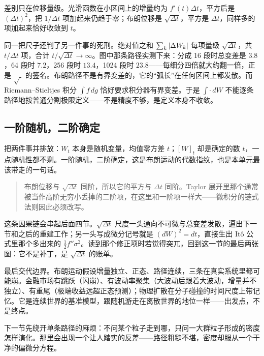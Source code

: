差别只在位移量级。光滑函数在小区间上的增量约为 \(f'(t)\Delta t\)，平方后是 \((\Delta t)^2\)，把 \(1/\Delta t\) 项加起来仍趋于零；布朗位移是 \(\sqrt{\Delta t}\)，平方是 \(\Delta t\)，同样多的项加起来恰好收敛到 \(t\)。

同一把尺子还判了另一件事的死刑。绝对值之和 \(\sum_k\left|\Delta W_k\right|\) 每项量级 \(\sqrt{\Delta t}\)，共 \(t/\Delta t\) 项，合计 \(t/\sqrt{\Delta t}\to\infty\)。图中那条路径实测下来：分成 16 段时总变差是 \(3.8\)，64 段时 \(7.2\)，256 段时 \(13.4\)，1024 段时 \(23.8\)——每细分四倍就大约翻一倍，正是 \(\sqrt{\;}\) 的签名。布朗路径不是有界变差的，它的``弧长''在任何区间上都发散。而 Riemann--Stieltjes 积分 \(\int f\,dg\) 恰好要求积分器有界变差。于是 \(\int\cdot\,dW\) 不能逐条路径地按普通分割极限定义——不是精度不够，是定义本身不收敛。

\subsection{一阶随机，二阶确定}

把两件事并排放：\(W_t\) 本身是随机变量，均值零方差 \(t\)；\([W]_t\) 却是确定的数 \(t\)，一点随机性都不剩。一阶随机，二阶确定，这是布朗运动的代数指纹，也是本单元最该带走的一句话。

\begin{quote}
布朗位移与 \(\sqrt{\Delta t}\) 同阶，所以它的平方与 \(\Delta t\) 同阶。Taylor 展开里那个通常被当作高阶无穷小丢掉的二阶项，在这里和一阶项一样大——微积分的链式法则因此必须改写。
\end{quote}

这条因果链会串起后面四节。\(\sqrt{\Delta t}\) 尺度一头通向不可微与总变差发散，逼出下一节和之后的重建工作；另一头写成微分记号就是 \((dW)^2=dt\)，直接生出 Itô 公式里那个多出来的 \(\tfrac12 f''\sigma^2\)。读到那个修正项时若觉得突兀，回到这一节的最后两张图：它不是补丁，是 \(\sqrt{\Delta t}\) 的账单。

最后交代边界。布朗运动假设增量独立、正态、路径连续，三条在真实系统里都可能崩。金融市场有跳跃（闪崩）、有波动率聚集（大波动后跟着大波动，增量并不独立）、有重尾（极端收益远超正态预测）；物理扩散在分子碰撞的时间尺度上带记忆。它是连续世界的基准模型，跟随机游走在离散世界的地位一样——出发点，不是终点。

下一节先绕开单条路径的麻烦：不问某个粒子走到哪，只问一大群粒子形成的密度怎样演化。那里会出现一个让人踏实的反差——路径粗糙不堪，密度却服从一个干净的偏微分方程。
